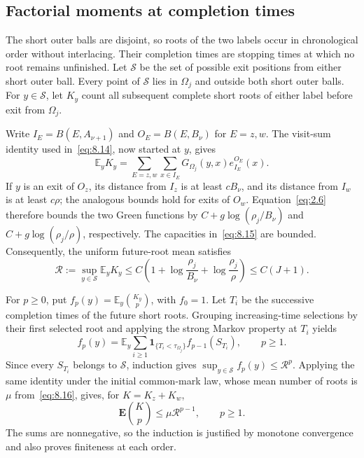 \documentclass[11pt,letterpaper,reqno]{amsart}
\numberwithin{equation}{section}
\theoremstyle{remark}
\begin{document}
\subsection{Factorial moments at completion times}\label{sec:factorial}
The short outer balls are disjoint, so roots of the two labels occur in chronological order without interlacing. Their completion times are stopping times at which no root remains unfinished. Let $\mathcal S$ be the set of possible exit positions from either short outer ball. Every point of $\mathcal S$ lies in $\Omega_j$ and outside both short outer balls. For $y\in\mathcal S$, let $K_y$ count all subsequent complete short roots of either label before exit from $\Omega_j$.

Write $I_E=B(E,A_{\nu+1})$ and $O_E=B(E,B_\nu)$ for $E=z,w$. The visit-sum identity used in~\eqref{eq:8.14}, now started at $y$, gives
\[
\mathbb E_yK_y
=\sum_{E=z,w}\sum_{x\in I_E}
G_{\Omega_j}(y,x)e_{I_E}^{O_E}(x).
\]
If $y$ is an exit of $O_z$, its distance from $I_z$ is at least $cB_\nu$, and its distance from $I_w$ is at least $c\rho$; the analogous bounds hold for exits of $O_w$. Equation~\eqref{eq:2.6} therefore bounds the two Green functions by $C+g\log(\rho_j/B_\nu)$ and $C+g\log(\rho_j/\rho)$, respectively. The capacities in~\eqref{eq:8.15} are bounded. Consequently, the uniform future-root mean satisfies
\begin{equation}\label{eq:8.17}
\mathcal R:=\sup_{y\in\mathcal S}\mathbb E_yK_y
\le C\left(1+\log\frac{\rho_j}{B_{\nu}}+\log\frac{\rho_j}{\rho}\right)
\le C(J+1).
\end{equation}

For $p\ge0$, put $f_p(y)=\mathbb E_y\binom{K_y}{p}$, with $f_0=1$. Let $T_i$ be the successive completion times of the future short roots. Grouping increasing-time selections by their first selected root and applying the strong Markov property at $T_i$ yields
\begin{equation}\label{eq:completion-recursion}
f_p(y)=\mathbb E_y\sum_{i\ge1}
\mathbf1_{\{T_i<\tau_{\Omega_j}\}}f_{p-1}(S_{T_i}),
\qquad p\ge1.
\end{equation}
Since every $S_{T_i}$ belongs to $\mathcal S$, induction gives $\sup_{y\in\mathcal S}f_p(y)\le\mathcal R^p$. Applying the same identity under the initial common-mark law, whose mean number of roots is $\mu$ from~\eqref{eq:8.16}, gives, for $K=K_z+K_w$,
\begin{equation}\label{eq:8.18}
\mathbf E\binom Kp\le\mu\mathcal R^{p-1},\qquad p\ge1.
\end{equation}
The sums are nonnegative, so the induction is justified by monotone convergence and also proves finiteness at each order.
\end{document}
